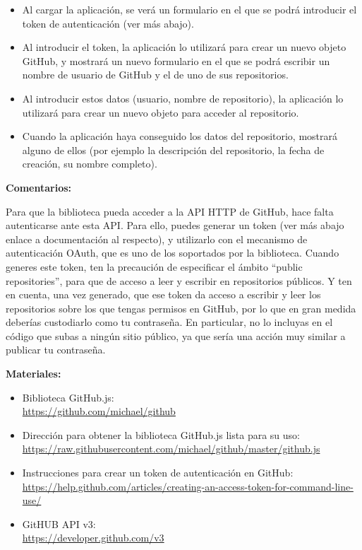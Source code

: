 \begin{itemize}
\item Al cargar la aplicación, se verá un formulario en el que se podrá introducir el token de autenticación (ver más abajo).
\item Al introducir el token, la aplicación lo utilizará para crear un nuevo objeto GitHub, y mostrará un nuevo formulario en el que se podrá escribir un nombre de usuario de GitHub y el de uno de sus repositorios.
\item Al introducir estos datos (usuario, nombre de repositorio), la aplicación lo utilizará para crear un nuevo objeto para acceder al repositorio.
\item Cuando la aplicación haya conseguido los datos del repositorio, mostrará alguno de ellos (por ejemplo la descripción del repositorio, la fecha de creación, su nombre completo).
\end{itemize}

\textbf{Comentarios:}

Para que la biblioteca pueda acceder a la API HTTP de GitHub, hace falta autenticarse ante esta API. Para ello, puedes generar un token (ver más abajo enlace a documentación al respecto), y utilizarlo con el mecanismo de autenticación OAuth, que es uno de los soportados por la biblioteca. Cuando generes este token, ten la precaución de especificar el ámbito ``public repositories'', para que de acceso a leer y escribir en repositorios públicos. Y ten en cuenta, una vez generado, que ese token da acceso a escribir y leer los repositorios sobre los que tengas permisos en GitHub, por lo que en gran medida deberías custodiarlo como tu contraseña. En particular, no lo incluyas en el código que subas a ningún sitio público, ya que sería una acción muy similar a publicar tu contraseña.

\textbf{Materiales:}

\begin{itemize}
\item Biblioteca GitHub.js: \\
  \url{https://github.com/michael/github}
\item Dirección para obtener la biblioteca GitHub.js lista para su uso: \\
  \url{https://raw.githubusercontent.com/michael/github/master/github.js}
\item Instrucciones para crear un token de autenticación en GitHub: \\
  \url{https://help.github.com/articles/creating-an-access-token-for-command-line-use/}
\item GitHUB API v3: \\
  \url{https://developer.github.com/v3}
\end{itemize}

